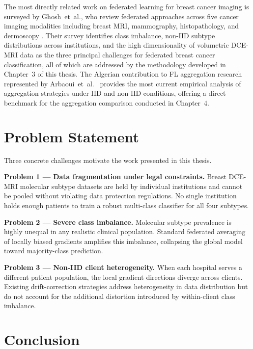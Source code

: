 The most directly related work on federated learning for breast
cancer imaging is surveyed by Ghosh~et~al., who review federated
approaches across five cancer imaging modalities including breast MRI,
mammography, histopathology, and dermoscopy
\cite{ghosh2020clustered}.
Their survey identifies class imbalance, non-IID subtype distributions
across institutions, and the high dimensionality of volumetric
DCE-MRI data as the three principal challenges for federated breast
cancer classification, all of which are addressed by the methodology
developed in Chapter~3 of this thesis.
The Algerian contribution to FL aggregation research represented by
Arbaoui~et~al.\ \cite{arbaoui2025survey} provides the most current
empirical analysis of aggregation strategies under IID and non-IID
conditions, offering a direct benchmark for the aggregation comparison
conducted in Chapter~4.


\section{Problem Statement}
\label{sec:problem-statement}

Three concrete challenges motivate the work presented
in this thesis.

\textbf{Problem 1 --- Data fragmentation under legal constraints.}
Breast DCE-MRI molecular subtype datasets are held by
individual institutions and cannot be pooled without
violating data protection regulations.
No single institution holds enough patients to train a
robust multi-class classifier for all four subtypes.

\textbf{Problem 2 --- Severe class imbalance.}
Molecular subtype prevalence is highly unequal in any
realistic clinical population.
Standard federated averaging of locally biased gradients
amplifies this imbalance, collapsing the global model
toward majority-class prediction.

\textbf{Problem 3 --- Non-IID client heterogeneity.}
When each hospital serves a different patient population,
the local gradient directions diverge across clients.
Existing drift-correction strategies address heterogeneity
in data distribution but do not account for the additional
distortion introduced by within-client class imbalance.


\section{Conclusion}
\label{sec:ch2-conclusion}

